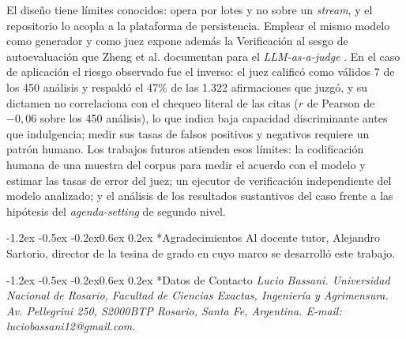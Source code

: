 \documentclass[12pt,a4paper,twocolumn]{article}
\makeatletter
\renewcommand\section{\@startsection{section}{1}{\z@}%
  {-1.2ex \@plus -0.5ex \@minus -0.2ex}{0.6ex \@plus 0.2ex}%
  {\normalfont\normalsize\bfseries}}
\makeatother
\begin{document}
El diseño tiene límites conocidos: opera por lotes y no sobre un \textit{stream}, y el repositorio lo acopla a la plataforma de persistencia. Emplear el mismo modelo como generador y como juez expone además la Verificación al sesgo de autoevaluación que Zheng et al. documentan para el \textit{LLM-as-a-judge} \cite{zheng:2023}. En el caso de aplicación el riesgo observado fue el inverso: el juez calificó como válidos 7 de los 450 análisis y respaldó el 47\% de las 1.322 afirmaciones que juzgó, y su dictamen no correlaciona con el chequeo literal de las citas (\(r\) de Pearson de \(-0{,}06\) sobre los 450 análisis), lo que indica baja capacidad discriminante antes que indulgencia; medir sus tasas de falsos positivos y negativos requiere un patrón humano. Los trabajos futuros atienden esos límites: la codificación humana de una muestra del corpus para medir el acuerdo con el modelo y estimar las tasas de error del juez; un ejecutor de verificación independiente del modelo analizado; y el análisis de los resultados sustantivos del caso frente a las hipótesis del \textit{agenda-setting} de segundo nivel.

\makeatletter
\renewcommand\section{\@startsection{section}{1}{\z@}%
  {-1.2ex \@plus -0.5ex \@minus -0.2ex}{0.6ex \@plus 0.2ex}%
  {\normalfont\fontsize{10}{12}\selectfont\bfseries}}
\makeatother
{\fontsize{10}{12}\selectfont
\section*{Agradecimientos}
\noindent Al docente tutor, Alejandro Sartorio, director de la tesina de grado en cuyo marco se desarrolló este trabajo.
}

{\fontsize{10}{12}\selectfont
\renewcommand{\refname}{Referencias}


}

{\fontsize{10}{12}\selectfont
\section*{Datos de Contacto}
\noindent\textit{Lucio Bassani. Universidad Nacional de Rosario, Facultad de Ciencias Exactas, Ingeniería y Agrimensura. Av. Pellegrini 250, S2000BTP Rosario, Santa Fe, Argentina. E-mail: luciobassani12@gmail.com.}
}
\end{document}
